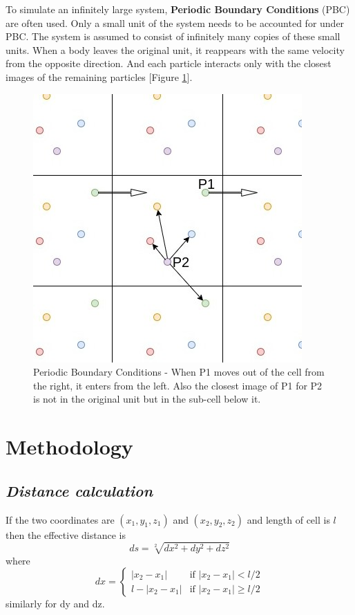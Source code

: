 \documentclass[twocolumn,11pt]{article}
\begin{document}
To simulate an infinitely large system, \textbf{Periodic Boundary Conditions} (PBC) are often used. Only a small unit of the system needs to be accounted for under PBC. The system is assumed to consist of infinitely many copies of these small units. When a body leaves the original unit, it reappears with the same velocity from the opposite direction. And each particle interacts only with the closest images of the remaining particles [Figure \ref{fig2}].
\begin{figure}
\centering
	\includegraphics[width=0.85\linewidth]{PBC}
	\caption{\small{Periodic Boundary Conditions - When P1 moves out of the cell from the right, it enters from the left. Also the closest image of P1 for P2 is not in the original unit but in the sub-cell below it.}}
	\label{fig2}
\end{figure}

\section{Methodology}

\subsection{\textit{Distance calculation}}
If the two coordinates are $(x_{1},y_{1},z_{1})$ and $(x_{2},y_{2},z_{2})$ and length of cell is \(l\) then the effective distance is
\begin{equation}
ds = \sqrt[2]{dx^2 + dy^2 + dz^2}
\end{equation}
where
\begin{equation}
dx = \begin{cases}
|x_2 - x_1| &\text{if } |x_2-x_1| < l/2 \\
l - |x_2 - x_1| &\text{if } |x_2-x_1| \ge l/2
\end{cases}
\end{equation}
similarly for dy and dz.
\end{document}
